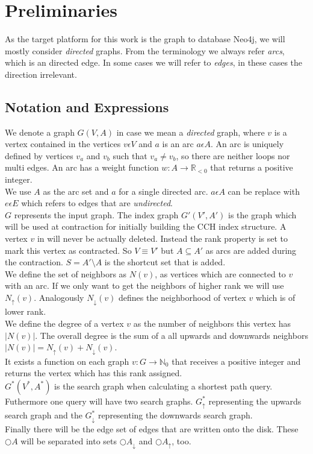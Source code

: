 \chapter{Preliminaries}

As the target platform for this work is the graph to database Neo4j, we will mostly consider \textit{directed} graphs.
From the terminology we always refer \textit{arcs}, which is an directed edge.
In some cases we will refer to \textit{edges}, in these cases the direction irrelevant.

\section{Notation and Expressions}
We denote a graph $G(V, A)$ in case we mean a \textit{directed} graph, where $v$ is a vertex contained in the vertices $v \epsilon  V$ and $a$ is an arc $a \epsilon A$.
An arc is uniquely defined by vertices $v_a$ and $v_b$ such that $v_a \neq v_b$, so there are neither loops nor multi edges.
An arc has a weight function $w: A \rightarrow \mathbb{R}_{<0} $ that returns a positive integer.
\\
We use $A$ as the arc set and $a$ for a single directed arc.
$a \epsilon A$ can be replace with $e \epsilon E$ which refers to edges that are \textit{undirected}. 
\\
$G$ represents the input graph.
The index graph $G'(V', A')$ is the graph which will be used at contraction for initially building the CCH index structure.
A vertex $v$ in will never be actually deleted.
Instead the rank property is set to mark this vertex as contracted.
So $V \equiv V'$ but $A \subseteq A'$ as arcs are added during the contraction.
$S = A' \setminus A$ is the shortcut set that is added.
\\
We define the set of neighbors as $N(v)$, as vertices which are connected to $v$ with an arc. 
If we only want to get the neighbors of higher rank we will use $N_\uparrow(v)$.
Analogously $N_\downarrow(v)$ defines the neighborhood of vertex $v$ which is of lower rank.
\\
We define the degree of a vertex $v$ as the number of neighbors this vertex has $|N(v)|$. 
The overall degree is the sum of a all upwards and downwards neighbors $|N(v)| = N_\uparrow(v) + N_\downarrow(v)$.
\\
It exists a function on each graph $v : G \rightarrow \mathbb{N}_0$ that receives a positive integer and returns the vertex which has this rank assigned.
\\
$G^*(V^*, A^*)$ is the search graph when calculating a shortest path query.
Futhermore one query will have two search graphs.
$G^*_\uparrow$ representing the upwards search graph and the $G^*_\downarrow$ representing the downwards search graph.
\\
Finally there will be the edge set of edges that are written onto the disk.
These $\bigcirc A$ will be separated into sets $\bigcirc A_\downarrow$ and $\bigcirc A_\uparrow $, too.

